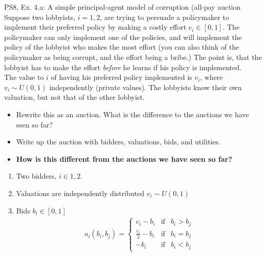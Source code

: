 \begin{frame}{PS8, Ex. 4.a: A simple principal-agent model of corruption (all-pay auction}
    Suppose two lobbyists, $i = 1, 2$, are trying to persuade a policymaker to implement their preferred policy by making a costly effort $e_i\in[0, 1]$. The policymaker can only implement one of the policies, and will implement the policy of the lobbyist who makes the most effort (you can also think of the policymaker as being corrupt, and the effort being a bribe.) The point is, that the lobbyist has to make the effort \textit{before} he learns if his policy is implemented.\\\medskip
    The value to $i$ of having his preferred policy implemented is $v_i$, where $v_i\sim U(0, 1)$ independently (private values). The lobbyists know their own valuation, but not that of the other lobbyist.
    \begin{itemize}
      \item[(a)] Rewrite this as an auction. What is the difference to the auctions we have seen so far?
    \end{itemize}
    \vspace{-8pt}
    \begin{multicols}{2}
      \begin{itemize}
        \item[Step 1:] Write up the auction with bidders, valuations, bids, and utilities.
        \item[Step 2:] \textbf{How is this different from the auctions we have seen so far?}
      \end{itemize}
      \vfill\null\columnbreak
      \begin{enumerate}
        \item Two bidders, $i\in1,2$.
        \item[] Valuations are independently distributed $v_i\sim U(0, 1)$
        \item[] Bids $b_i\in[0,1]$
        \begin{align*}
          u_i(b_i,b_j)=\left\{\begin{array}{lcl}
            v_i-b_i           & \text{if} & b_i>b_j \\
            \frac{v_i}{2}-b_i & \text{if} & b_i=b_j \\
            -b_i              & \text{if} & b_i<b_j
          \end{array}\right.
        \end{align*}
      \end{enumerate}
      \vfill\null
    \end{multicols}
\end{frame}
